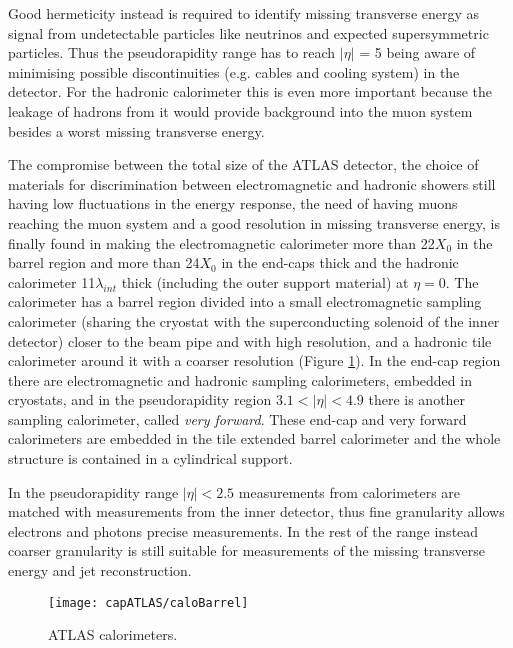 Good hermeticity instead is required to identify missing transverse energy as signal from undetectable particles like neutrinos and expected supersymmetric particles. Thus the pseudorapidity range has to reach $|\eta|$ = 5 being aware of minimising possible discontinuities (e.g. cables and cooling system) in the detector. For the hadronic calorimeter this is even more important because the leakage of hadrons from it would provide background into the muon system besides a worst missing transverse energy.

The compromise between the total size of the ATLAS detector, the choice of materials for discrimination between electromagnetic and hadronic showers still having low fluctuations in the energy response, the need of having muons reaching the muon system and a good resolution in missing transverse energy, is finally found in making the electromagnetic calorimeter more than 22$X_{0}$ in the barrel region and more than 24$X_{0}$ in the end-caps thick and the hadronic calorimeter 11$\lambda_{int}$ thick (including the outer support material) at $\eta=0$. The calorimeter has a barrel region divided into a small electromagnetic sampling calorimeter (sharing the cryostat with the superconducting solenoid of the inner detector) closer to the beam pipe and with high resolution, and a hadronic tile calorimeter around it with a coarser resolution (Figure \ref{caloBarrel}). In the end-cap region there are electromagnetic and hadronic sampling calorimeters, embedded in cryostats, and in the pseudorapidity region $3.1 < |\eta| < 4.9$ there is another sampling calorimeter, called \textit{very forward}. These end-cap and very forward calorimeters are embedded in the tile extended barrel calorimeter and the whole structure is contained in a cylindrical support.

In the pseudorapidity range $|\eta|<2.5$ measurements from calorimeters are matched with measurements from the inner detector, thus fine granularity allows electrons and photons precise measurements. In the rest of the range instead coarser granularity is still suitable for measurements of the missing transverse energy and jet reconstruction.

\begin{figure}[htb]\begin{center}
\texttt{[image: capATLAS/caloBarrel]}\caption{ATLAS calorimeters. }\label{caloBarrel}
\end{center}\end{figure}



